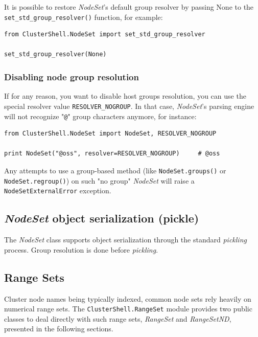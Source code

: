 \documentclass[english,a4paper]{csuserguide}
\newcommand{\NodeSet}{\textit{NodeSet}\xspace}
\newcommand{\RangeSet}{\textit{RangeSet}\xspace}
\newcommand{\RangeSetND}{\textit{RangeSetND}\xspace}
\begin{document}
It is possible to restore \NodeSet's default group resolver by passing None to the \lstinline+set_std_group_resolver()+ function, for example:
\medskip
\begin{lstlisting}[breaklines=true, breakatwhitespace=true]
from ClusterShell.NodeSet import set_std_group_resolver

set_std_group_resolver(None)
\end{lstlisting}

\subsubsection{Disabling node group resolution}
\label{class-NodeSet-disable-group}

If for any reason, you want to disable host groups resolution, you can use the special resolver value \lstinline+RESOLVER_NOGROUP+. In that case, \NodeSet's parsing engine will not recognize "\verb+@+" group characters anymore, for instance:
\medskip
\begin{lstlisting}[breaklines=true, breakatwhitespace=true]
from ClusterShell.NodeSet import NodeSet, RESOLVER_NOGROUP

print NodeSet("@oss", resolver=RESOLVER_NOGROUP)     # @oss
\end{lstlisting}

Any attempts to use a group-based method (like \lstinline+NodeSet.groups()+ or \lstinline+NodeSet.regroup()+) on such "no group" \NodeSet will raise a \texttt{NodeSetExternalError} exception.


\subsection{\NodeSet object serialization (pickle)}

The \NodeSet class supports object serialization through the standard \textit{pickling} process. Group resolution is done before \textit{pickling}.


\subsection{Range Sets}
\label{module-RangeSet}

Cluster node names being typically indexed, common node sets rely heavily on numerical range sets.
The \verb+ClusterShell.RangeSet+ module provides two public classes to deal directly with such range sets, \RangeSet and \RangeSetND, presented in the following sections.
\end{document}
